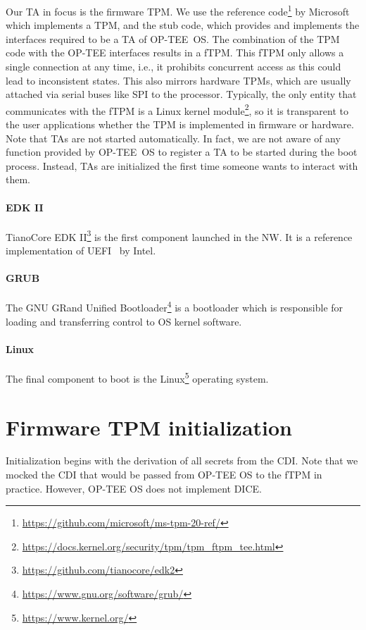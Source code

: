 Our TA in focus is the firmware TPM\@.
We use the reference code\footnote{\url{https://github.com/microsoft/ms-tpm-20-ref/}} by Microsoft which implements a TPM, and the stub code, which provides and implements the interfaces required to be a TA of OP-TEE~OS\@.
The combination of the TPM code with the OP-TEE interfaces results in a \ac{fTPM}\@.
This fTPM only allows a single connection at any time, i.e., it prohibits concurrent access as this could lead to inconsistent states.
This also mirrors hardware TPMs, which are usually attached via serial buses like SPI to the processor.
Typically, the only entity that communicates with the fTPM is a Linux kernel module\footnote{\url{https://docs.kernel.org/security/tpm/tpm_ftpm_tee.html}}, so it is transparent to the user applications whether the TPM is implemented in firmware or hardware.
Note that TAs are not started automatically.
In fact, we are not aware of any function provided by OP-TEE~OS to register a TA to be started during the boot process. 
Instead, TAs are initialized the first time someone wants to interact with them.

\paragraph{EDK II}
TianoCore EDK II\footnote{\url{https://github.com/tianocore/edk2}} is the first component launched in the \ac{NW}.
It is a reference implementation of UEFI~\cite{UEFI} by Intel.

\paragraph{GRUB}
The GNU GRand Unified Bootloader\footnote{\url{https://www.gnu.org/software/grub/}} is a bootloader which is responsible for loading and transferring control to OS kernel software.

\paragraph{Linux}
The final component to boot is the Linux\footnote{\url{https://www.kernel.org/}} operating system.

\section{Firmware TPM initialization}

Initialization begins with the derivation of all secrets from the CDI\@.
Note that we mocked the CDI that would be passed from OP-TEE OS to the fTPM in practice.
However, OP-TEE OS does not implement DICE\@.

